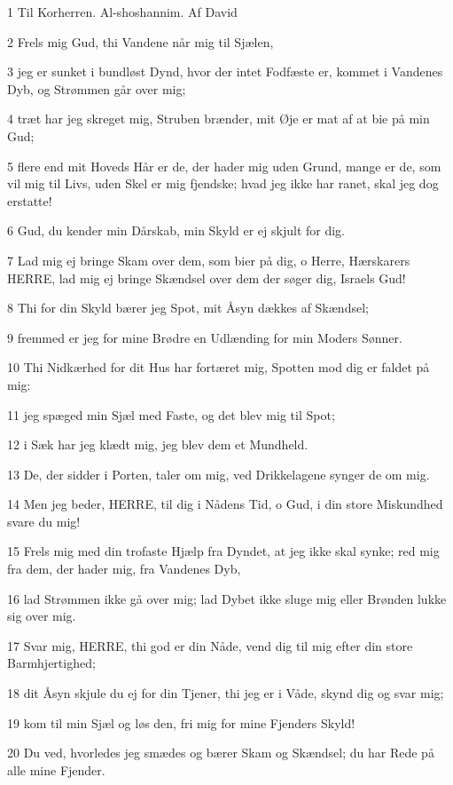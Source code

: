 \par 1 Til Korherren. Al-shoshannim. Af David
\par 2 Frels mig Gud, thi Vandene når mig til Sjælen,
\par 3 jeg er sunket i bundløst Dynd, hvor der intet Fodfæste er, kommet i Vandenes Dyb, og Strømmen går over mig;
\par 4 træt har jeg skreget mig, Struben brænder, mit Øje er mat af at bie på min Gud;
\par 5 flere end mit Hoveds Hår er de, der hader mig uden Grund, mange er de, som vil mig til Livs, uden Skel er mig fjendske; hvad jeg ikke har ranet, skal jeg dog erstatte!
\par 6 Gud, du kender min Dårskab, min Skyld er ej skjult for dig.
\par 7 Lad mig ej bringe Skam over dem, som bier på dig, o Herre, Hærskarers HERRE, lad mig ej bringe Skændsel over dem der søger dig, Israels Gud!
\par 8 Thi for din Skyld bærer jeg Spot, mit Åsyn dækkes af Skændsel;
\par 9 fremmed er jeg for mine Brødre en Udlænding for min Moders Sønner.
\par 10 Thi Nidkærhed for dit Hus har fortæret mig, Spotten mod dig er faldet på mig:
\par 11 jeg spæged min Sjæl med Faste, og det blev mig til Spot;
\par 12 i Sæk har jeg klædt mig, jeg blev dem et Mundheld.
\par 13 De, der sidder i Porten, taler om mig, ved Drikkelagene synger de om mig.
\par 14 Men jeg beder, HERRE, til dig i Nådens Tid, o Gud, i din store Miskundhed svare du mig!
\par 15 Frels mig med din trofaste Hjælp fra Dyndet, at jeg ikke skal synke; red mig fra dem, der hader mig, fra Vandenes Dyb,
\par 16 lad Strømmen ikke gå over mig; lad Dybet ikke sluge mig eller Brønden lukke sig over mig.
\par 17 Svar mig, HERRE, thi god er din Nåde, vend dig til mig efter din store Barmhjertighed;
\par 18 dit Åsyn skjule du ej for din Tjener, thi jeg er i Våde, skynd dig og svar mig;
\par 19 kom til min Sjæl og løs den, fri mig for mine Fjenders Skyld!
\par 20 Du ved, hvorledes jeg smædes og bærer Skam og Skændsel; du har Rede på alle mine Fjender.
